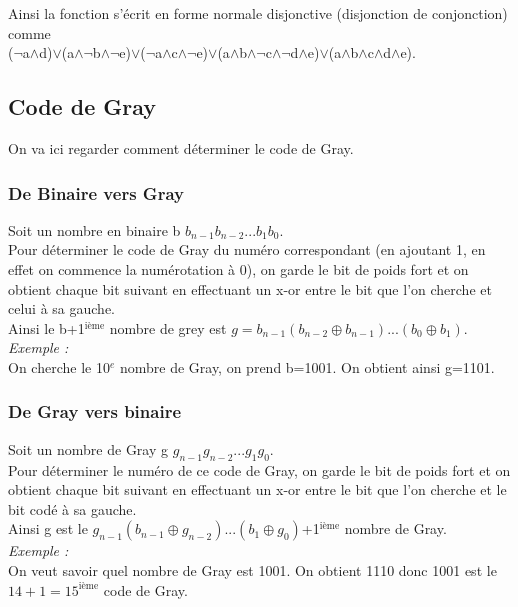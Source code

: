 \documentclass[a4paper,10pt]{book}
\begin{document}
Ainsi la fonction s’écrit en forme normale disjonctive (disjonction de conjonction) comme\\
($\neg$a$\wedge$d)$\vee$(a$\wedge\neg$b$\wedge\neg$e)$\vee $($\neg$a$\wedge$c$\wedge\neg$e)$\vee $(a$\wedge$b$\wedge\neg$c$\wedge\neg$d$\wedge$e)$\vee $(a$\wedge$b$\wedge$c$\wedge$d$\wedge$e).\\

\subsection{Code de Gray} \label{gray}
On va ici regarder comment déterminer le code de Gray.

\subsubsection{De Binaire vers Gray}
Soit un nombre en binaire b $b_{n-1}b_{n-2}...b_{1}b_{0}$.\\

Pour déterminer le code de Gray du numéro correspondant (en ajoutant 1, en effet on commence la numérotation à 0), on garde le bit de poids fort et on obtient chaque bit suivant en effectuant un x-or entre le bit que l'on cherche et celui à sa gauche.\\

Ainsi le b+1$^{\text{ième}}$ nombre de grey est $g=b_{n-1}(b_{n-2}\oplus b_{n-1})...(b_{0}\oplus b_{1})$.\\

\textit{Exemple :}\\
On cherche le 10$^{e}$ nombre de Gray, on prend b=1001. On obtient ainsi g=1101.

\subsubsection{De Gray vers binaire}
Soit un nombre de Gray g $g_{n-1}g_{n-2}...g_{1}g_{0}$.\\

Pour déterminer le numéro de ce code de Gray, on garde le bit de poids fort et on obtient chaque bit suivant en effectuant un x-or entre le bit que l'on cherche et le bit codé à sa gauche.\\

Ainsi g est le $g_{n-1}(b_{n-1}\oplus g_{n-2})...(b_{1}\oplus g_{0})$+1$^{\text{ième}}$ nombre de Gray.\\

\textit{Exemple :}\\
On veut savoir quel nombre de Gray est 1001. On obtient 1110 donc 1001 est le $14+1=15^{\text{ième}}$ code de Gray.
\end{document}
